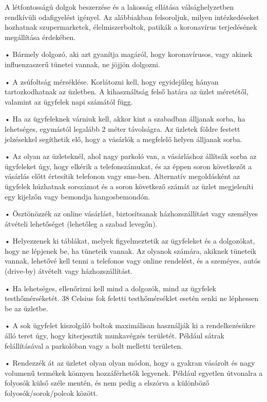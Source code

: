 \documentclass[onecolumn,journal]{IEEEtran}
\begin{document}
\begin{multicols}{2}

A létfontosságú dolgok beszerzése és a lakosság ellátása válsághelyzetben rendkívüli odafigyelést igényel. Az alábbiakban felsoroljuk, milyen intézkedéseket hozhatnak szupermarketek, élelmiszerboltok, patikák a koronavírus terjedésének megállítása érdekében.

• Bármely dolgozó, aki azt gyanítja magáról, hogy koronavírusos, vagy akinek influenzaszerű tünetei vannak, ne jöjjön dolgozni.

• A zsúfoltság mérséklése. Korlátozni kell, hogy egyidejűleg hányan tartozkodhatnak az üzletben. A kihasználtság felső határa
az üzlet méretétől, valamint az ügyfelek napi számától függ.

• Ha az ügyfeleknek várniuk kell, akkor kint a szabadban álljanak sorba, ha lehetséges, egymástól legalább 2 méter távolságra. Az üzletek földre festett jelzésekkel segíthetik elő, hogy a vásárlók a megfelelő helyen álljanak sorba.

• Az olyan az üzleteknél, ahol nagy parkoló van, a vásárláshoz állítsák sorba az ügyfeleket úgy, hogy elkérik a telefonszámukat, és az éppen soron következőt a vásárlás előtt értesítik telefonon vagy sms-ben. Alternatív megoldásként az ügyfelek húzhatnak sorszámot és a soron következő számát az üzlet megjeleníti egy kijelzőn vagy bemondja hangosbemondón.

• Ösztönözzék az online vásárlást, biztosítsanak házhozszállítást vagy személyes átvételi lehetőséget (lehetőleg a szabad levegőn).

• Helyezzenek ki táblákat, melyek figyelmeztetik az ügyfeleket és a dolgozókat, hogy ne lépjenek be, ha tüneteik vannak. Az olyanok számára, akiknek tüneteik vannak, lehetővé kell tenni a telefonos vagy online rendelést, és a szeméyes, autós (drive-by) átvételt vagy házhozszállítást.

• Ha lehetséges, ellenőrizni kell mind a dolgozók, mind az ügyfelek testhőmérséketét. 38 Celsius fok feletti testhőmérséklet esetén senki ne léphessen be az üzletbe.

• A sok ügyfelet kiszolgáló boltok maximálisan használják ki a rendelkezésükre álló teret úgy, hogy kiterjesztik munkavégzés területét. Például sátrak felállításával a parkolóban vagy a bolt melletti területen.

• Rendezzék át az üzletet olyan olyan módon, hogy a gyakran vásárolt és nagy volumenű termékek könnyen hozzáférhetők legyenek. Például egyetlen útvonalra a folyosók külső széle mentén, és nem pedig a elszórva a különböző folyosók/sorok/polcok között.


\end{multicols}
\end{document}
